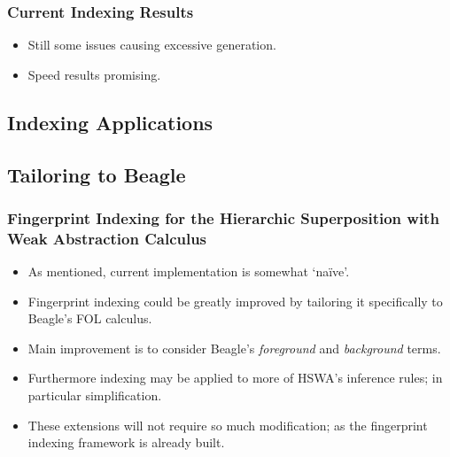 \documentclass[10pt]{beamer}
\begin{document}
\begin{NoHyper}
\begin{frame}
\begin{itemize}
  \end{itemize}
\end{frame}
\begin{frame}
  \frametitle{Current Indexing Results}
  \begin{itemize}
  \item<1-> Still some issues causing excessive generation.
  \item<2-> Speed results promising.

  \end{itemize}
\end{frame}

\subsection{Indexing Applications}

\subsection{Tailoring to Beagle}
\begin{frame}
  \frametitle{Fingerprint Indexing for the Hierarchic Superposition with Weak Abstraction Calculus}
  \begin{itemize}
  \item<1-> As mentioned, current implementation is somewhat `na\"{i}ve'.
  \item<2-> Fingerprint indexing could be greatly improved by tailoring it specifically
  to Beagle's FOL calculus.
  \item<2-> Main improvement is to consider Beagle's \emph{foreground} and \emph{background}
  terms.
  \item<3-> Furthermore indexing may be applied to more
  of HSWA's inference rules; in particular simplification.
  \item<4-> These extensions will not require so much modification; as the fingerprint
  indexing framework is already built.
  \end{itemize}
\end{frame}


\end{NoHyper}
\end{document}
